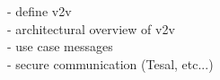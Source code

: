 - define v2v\\
- architectural overview of v2v\\
- use case messages\\
- secure communication (Tesal, etc...)\\

